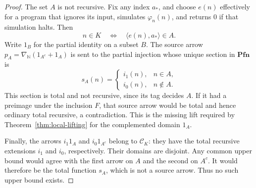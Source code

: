 \documentclass[11pt]{article}
\newcommand{\N}{\mathbb N}
\newcommand{\Pfn}{\mathbf{Pfn}}
\begin{document}
\begin{proof}
The set $A$ is not recursive. Fix any index $a_*$, and choose $e(n)$
effectively for a program that ignores its input, simulates
$\varphi_n(n)$, and returns $0$ if that simulation halts. Then
\[
 n\in K\quad\Longleftrightarrow\quad
 \langle e(n),a_*\rangle\in A.
\]
Write $1_B$ for the partial identity on a subset $B$. The source
arrow $p_A=\nabla_{\N}(1_{A^c}+1_A)$ is sent to the partial
injection whose unique section in $\Pfn$ is
\[
 s_A(n)=
 \begin{cases}
  i_1(n),&n\in A,\\
  i_0(n),&n\notin A.
 \end{cases}
\]
This section is total and not recursive, since its tag decides $A$.
If it had a preimage under the inclusion $F$, that source arrow would
be total and hence ordinary total recursive, a contradiction.
This is the missing lift required by
Theorem~\ref{thm:local-lifting} for the complemented domain $1_A$.

Finally, the arrows $i_1 1_A$ and $i_0 1_{A^c}$ belong to
$\mathcal C_K$: they have the total recursive extensions $i_1$
and $i_0$, respectively. Their domains are disjoint. Any common
upper bound would agree with the first arrow on $A$ and the second
on $A^c$. It would therefore be the total function $s_A$, which
is not a source arrow. Thus no such upper bound exists.
\end{proof}
\end{document}
